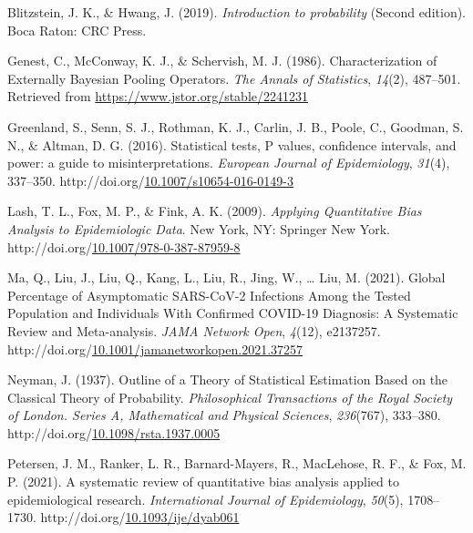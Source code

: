 \documentclass[12pt,twoside]{smiththesis}
\newlength{\cslhangindent}
\newenvironment{CSLReferences}[2] %
 {%
\setlength{\parindent}{0pt}
\ifodd #1 \everypar{\setlength{\hangindent}{\cslhangindent}}\ignorespaces\fi
\ifnum #2 > 0
\setlength{\parskip}{#2\baselineskip}
  \fi
}%
{}
\begin{document}
\hypertarget{refs}{}
\begin{CSLReferences}{1}{0}
\leavevmode{}%
Blitzstein, J. K., \& Hwang, J. (2019). \emph{Introduction to probability} (Second edition). Boca Raton: CRC Press.

\leavevmode{}%
Genest, C., McConway, K. J., \& Schervish, M. J. (1986). Characterization of Externally Bayesian Pooling Operators. \emph{The Annals of Statistics}, \emph{14}(2), 487--501. Retrieved from \url{https://www.jstor.org/stable/2241231}

\leavevmode{}%
Greenland, S., Senn, S. J., Rothman, K. J., Carlin, J. B., Poole, C., Goodman, S. N., \& Altman, D. G. (2016). Statistical tests, P values, confidence intervals, and power: a guide to misinterpretations. \emph{European Journal of Epidemiology}, \emph{31}(4), 337--350. http://doi.org/\href{https://doi.org/10.1007/s10654-016-0149-3}{10.1007/s10654-016-0149-3}

\leavevmode{}%
Lash, T. L., Fox, M. P., \& Fink, A. K. (2009). \emph{Applying Quantitative Bias Analysis to Epidemiologic Data}. New York, NY: Springer New York. http://doi.org/\href{https://doi.org/10.1007/978-0-387-87959-8}{10.1007/978-0-387-87959-8}

\leavevmode{}%
Ma, Q., Liu, J., Liu, Q., Kang, L., Liu, R., Jing, W., \ldots{} Liu, M. (2021). Global Percentage of Asymptomatic SARS-CoV-2 Infections Among the Tested Population and Individuals With Confirmed COVID-19 Diagnosis: A Systematic Review and Meta-analysis. \emph{JAMA Network Open}, \emph{4}(12), e2137257. http://doi.org/\href{https://doi.org/10.1001/jamanetworkopen.2021.37257}{10.1001/jamanetworkopen.2021.37257}

\leavevmode{}%
Neyman, J. (1937). Outline of a Theory of Statistical Estimation Based on the Classical Theory of Probability. \emph{Philosophical Transactions of the Royal Society of London. Series A, Mathematical and Physical Sciences}, \emph{236}(767), 333--380. http://doi.org/\href{https://doi.org/10.1098/rsta.1937.0005}{10.1098/rsta.1937.0005}

\leavevmode{}%
Petersen, J. M., Ranker, L. R., Barnard-Mayers, R., MacLehose, R. F., \& Fox, M. P. (2021). A systematic review of quantitative bias analysis applied to epidemiological research. \emph{International Journal of Epidemiology}, \emph{50}(5), 1708--1730. http://doi.org/\href{https://doi.org/10.1093/ije/dyab061}{10.1093/ije/dyab061}


\end{CSLReferences}
\end{document}
